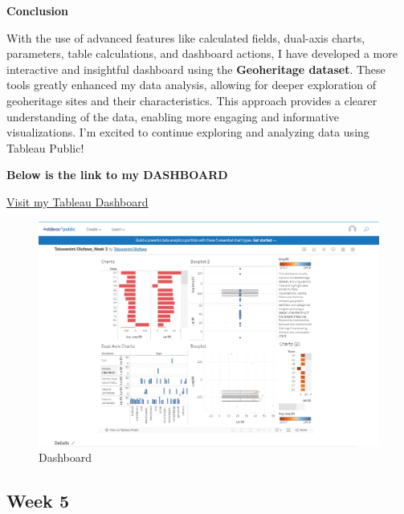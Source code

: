 \documentclass[
  letterpaper,
  DIV=11,
  numbers=noendperiod]{scrreprt}
\begin{document}
\textbf{Conclusion}

With the use of advanced features like calculated fields, dual-axis
charts, parameters, table calculations, and dashboard actions, I have
developed a more interactive and insightful dashboard using the
\textbf{Geoheritage dataset}. These tools greatly enhanced my data
analysis, allowing for deeper exploration of geoheritage sites and their
characteristics. This approach provides a clearer understanding of the
data, enabling more engaging and informative visualizations. I'm excited
to continue exploring and analyzing data using Tableau Public!

\textbf{Below is the link to my DASHBOARD}

\href{https://public.tableau.com/views/ToluwanimiOlufawo_Week3/Dashboard1?:language=en-US&:sid=&:redirect=auth&:display_count=n&:origin=viz_share_link}{Visit
my Tableau Dashboard}

\begin{figure}[H]

{\centering \includegraphics{Final.png}

}

\caption{Dashboard}

\end{figure}%

\subsection{Week 5}\label{week-5-3}
\end{document}
